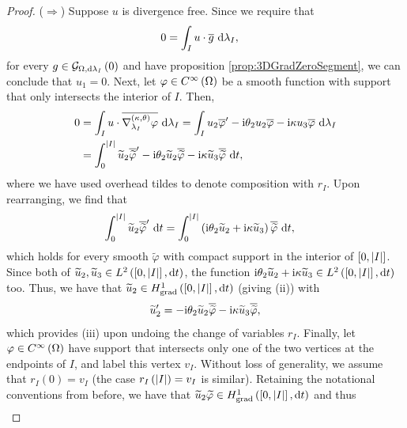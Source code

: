 \begin{proof}
	($\Rightarrow$) Suppose $u$ is divergence free.
	Since we require that
	\begin{align*}
		0 &= \int_{I} u\cdot \overline{g} \ \mathrm{d}\lambda_I,
	\end{align*}
	for every $g\in\mathcal{G}_{ \Omega, \mathrm{d}\lambda_I}\left( 0 \right)$ and have proposition \ref{prop:3DGradZeroSegment}, we can conclude that $u_1=0$.
	Next, let $\varphi\in C^{\infty}\left( \Omega \right)$ be a smooth function with support that only intersects the interior of $I$.
	Then,
	\begin{align*}
		0 &= \int_{I} u\cdot\overline{\nabla^{\left( \kappa, \theta \right)}_{\lambda_I}\varphi}  \ \mathrm{d}\lambda_I
		= \int_{I} u_2\overline{\varphi}' - \mathrm{i}\theta_2 u_2\overline{\varphi} - \mathrm{i}\kappa u_3\overline{\varphi}  \ \mathrm{d}\lambda_I \\
		&= \int_0^{\left\lvert I \right\rvert} \widetilde{u}_2\overline{\widetilde{\varphi}}' - \mathrm{i}\theta_2\widetilde{u}_2\overline{\widetilde{\varphi}} - \mathrm{i}\kappa\widetilde{u}_3\overline{\widetilde{\varphi}} \ \mathrm{d} t,
	\end{align*}
	where we have used overhead tildes to denote composition with $r_I$.
	Upon rearranging, we find that
	\begin{align*}
		\int_0^{\left\lvert I \right\rvert} \widetilde{u}_2\overline{\widetilde{\varphi}}' \ \mathrm{d} t
		&= \int_0^{\left\lvert I \right\rvert} \left(  \mathrm{i}\theta_2\widetilde{u}_2 + \mathrm{i}\kappa\widetilde{u}_3  \right)\overline{\widetilde{\varphi}} \ \mathrm{d} t,
	\end{align*}
	which holds for every smooth $\widetilde{\varphi}$ with compact support in the interior of $\left[ 0,\left\lvert I \right\rvert \right]$.
	Since both of $\widetilde{u}_2, \widetilde{u}_3\in L^{2}\left( \left[ 0,\left\lvert I \right\rvert \right],\mathrm{d}t \right)$, the function $\mathrm{i}\theta_2\widetilde{u}_2 + \mathrm{i}\kappa\widetilde{u}_3\in L^{2}\left( \left[ 0,\left\lvert I \right\rvert \right],\mathrm{d}t \right)$ too.
	Thus, we have that $\widetilde{u}_2\in H^1_\mathrm{grad}\left( \left[ 0,\left\lvert I \right\rvert \right], \mathrm{d}t \right)$ (giving (ii)) with 
	\begin{align*}
		\widetilde{u}'_2 = - \mathrm{i}\theta_2\widetilde{u}_2\overline{\widetilde{\varphi}} - \mathrm{i}\kappa\widetilde{u}_3\overline{\widetilde{\varphi}},
	\end{align*}
	which provides (iii) upon undoing the change of variables $r_I$.
	Finally, let $\varphi\in C^{\infty}\left( \Omega \right)$ have support that intersects only one of the two vertices at the endpoints of $I$, and label this vertex $v_I$.
	Without loss of generality, we assume that $r_I(0)=v_I$ (the case $r_I\left( \left\lvert I \right\rvert \right)=v_I$ is similar).
	Retaining the notational conventions from before, we have that $\widetilde{u}_2\widetilde{\varphi}\in H^1_\mathrm{grad}\left( \left[ 0,\left\lvert I \right\rvert \right], \mathrm{d}t \right)$ and thus
	\begin{align*}

\end{align*}
\end{proof}
